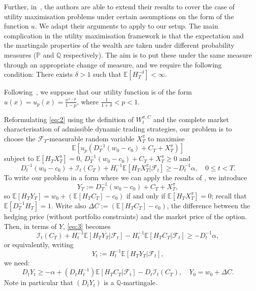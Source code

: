 \documentclass[a4paper]{amsart}
\theoremstyle{definition}
\theoremstyle{remark}
\numberwithin{equation}{section}
\newcommand{\E}{\mathbb{E}}
\renewcommand{\P}{\mathbb{P}}
\newcommand{\Q}{\mathbb{Q}}
\newcommand{\Fc}{\mathcal{F}}
\newcommand{\Ep}[1]{\E\left[#1\right]}
\newcommand{\comment}[1]{{\color{red} \bf #1}}
\newcommand{\In}{\mathcal{I}} %
\begin{document}
Further, in~\cite{El-Karoui:2006aa}, the authors are able to extend their results to cover the case of utility maximisation problems under certain assumptions on the form of the function $u$. We adapt their arguments to apply to our setup. The main complication in the utility maximisation framework is that the expectation and the martingale properties of the wealth are taken under different probability measures ($\P$ and $\Q$ respectively). The aim is to put these under the same measure through an appropriate change of measure, and we require the following condition: There exists $\delta>1$ such that $\Ep{H^{-\delta}_T} <\infty$.

Following~\cite{El-Karoui:2006aa}, we suppose that our utility function is of the form $u(x) = u_p(x) = \frac{x^{1-p}}{1-p}$, where $\frac{1}{1+\delta} < p < 1$. %

Reformulating \eqref{eq:2} using the definition of $W_t^{\pi,C}$ and the complete market characterisation of admissible dynamic trading strategies, our problem is to choose the $\Fc_T$-measurable random variable $X_T^\pi$ to maximise 
$$\Ep{u_p(D_T^{-1}(w_0 - c_0) + C_T + X_T^\pi)}$$
subject to $\Ep{H_T X_T^\pi} = 0$, $D_T^{-1}(w_0 - c_0) + C_T + X_T^\pi \ge 0$ and
\begin{equation}\label{eq:3}
   D_t^{-1}(w_0 - c_0)  + \In_t(C_T) + H_t^{-1}\Ep{H_T X_T^\pi|\Fc_t} \ge -D_t^{-1}\alpha, \quad 0 \le t < T.
\end{equation}
To write our problem in a form where we can apply the results of \cite{El-Karoui:2006aa}, we introduce
\begin{equation}\label{def:Y1}
  Y_T := D_T^{-1}(w_0 - c_0)+C_T+X_T^\pi ,
\end{equation}
so $\Ep{H_T Y_T} = w_0 + (\Ep{H_T C_T} -c_0)$ if and only if $\Ep{H_T X_T^\pi} = 0$; recall that $\Ep{D_T^{-1} H_T} =  1$. Write also $\Delta C := (\Ep{H_T C_T} -c_0) $, the difference between the hedging price (without portfolio constraints) and the market price of the option. Then, in terms of $Y$, \eqref{eq:3} becomes
\begin{equation*}
  \In_t(C_T) + H_t^{-1}\Ep{H_T Y_T|\Fc_t} - H_t^{-1}\Ep{H_T C_T | \Fc_t} \ge -D_t^{-1}\alpha ,
\end{equation*}
or equivalently, writing 
\begin{equation}\label{def:Y2}
Y_t := H_t^{-1} \Ep{H_T Y_T|\Fc_t}, 
\end{equation}
we need:
\begin{equation*}
  D_t Y_t \ge -\alpha + (D_t H_t^{-1}) \Ep{H_T C_T|\Fc_t} - D_t \In_t(C_T), \quad Y_ 0 = w_0 + \Delta C.
\end{equation*}
Note in particular that $(D_tY_t)$ is a $\Q$-martingale.
\end{document}

